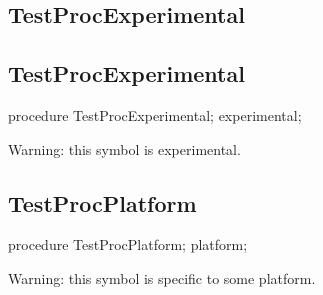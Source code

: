\documentclass{report}
\newif\ifpdf
\begin{document}
\subsection*{\large{\textbf{TestProcExperimental}}\normalsize\hspace{1ex}\hrulefill}
\else
\subsection*{TestProcExperimental}
\fi
\label{ok_hint_directives-TestProcExperimental}
\begin{list}{}{
\setlength{\itemindent}{0cm}
\setlength{\listparindent}{0cm}
\setlength{\leftmargin}{\evensidemargin}
\addtolength{\leftmargin}{\tmplength}
\settowidth{\labelsep}{X}
\addtolength{\leftmargin}{\labelsep}
\setlength{\labelwidth}{\tmplength}
}
\item[\textbf{Declaration}\hfill]
\ifpdf
\begin{flushleft}
\fi
\begin{ttfamily}
procedure TestProcExperimental; experimental;\end{ttfamily}

\ifpdf
\end{flushleft}
\fi

\par
\item[\textbf{Description}]
Warning: this symbol is experimental.

 

\end{list}
\ifpdf
\subsection*{\large{\textbf{TestProcPlatform}}\normalsize\hspace{1ex}\hrulefill}
\else
\subsection*{TestProcPlatform}
\fi
\label{ok_hint_directives-TestProcPlatform}
\begin{list}{}{
\setlength{\itemindent}{0cm}
\setlength{\listparindent}{0cm}
\setlength{\leftmargin}{\evensidemargin}
\addtolength{\leftmargin}{\tmplength}
\settowidth{\labelsep}{X}
\addtolength{\leftmargin}{\labelsep}
\setlength{\labelwidth}{\tmplength}
}
\item[\textbf{Declaration}\hfill]
\ifpdf
\begin{flushleft}
\fi
\begin{ttfamily}
procedure TestProcPlatform; platform;\end{ttfamily}

\ifpdf
\end{flushleft}
\fi

\par
\item[\textbf{Description}]
Warning: this symbol is specific to some platform.

 

\end{list}
\ifpdf
\end{document}
